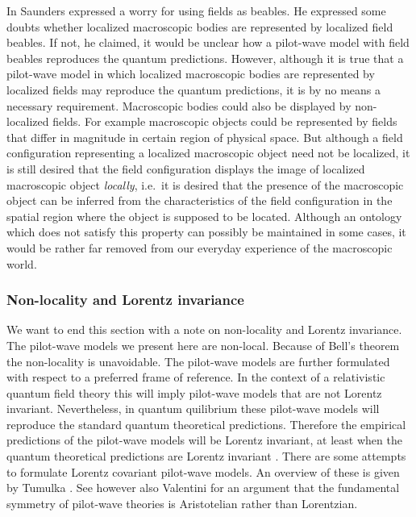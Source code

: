 \documentclass[12pt]{article}
\begin{document}
In \cite{saunders99} Saunders expressed a worry for using fields as beables. He expressed some doubts whether localized macroscopic bodies are represented by localized field beables. If not, he claimed, it would be unclear how a pilot-wave model with field beables reproduces the quantum predictions. However, although it is true that a pilot-wave model in which localized macroscopic bodies are represented by localized fields may reproduce the quantum predictions, it is by no means a necessary requirement. Macroscopic bodies could also be displayed by non-localized fields. For example macroscopic objects could be represented by fields that differ in magnitude in certain region of physical space. But although a field configuration representing a localized macroscopic object need not be localized, it is still desired that the field configuration displays the image of localized macroscopic object {\em locally}, i.e.\ it is desired that the presence of the macroscopic object can be inferred from the characteristics of the field configuration in the spatial region where the object is supposed to be located. Although an ontology which does not satisfy this property can possibly be maintained in some cases, it would be rather far removed from our everyday experience of the macroscopic world.  


\subsubsection{Non-locality and Lorentz invariance}
We want to end this section with a note on non-locality and Lorentz invariance. The pilot-wave models we present here are non-local. Because of Bell's theorem the non-locality is unavoidable. The pilot-wave models are further formulated with respect to a preferred frame of reference. In the context of a relativistic quantum field theory this will imply pilot-wave models that are not Lorentz invariant. Nevertheless, in quantum quilibrium these pilot-wave models will reproduce the standard quantum theoretical predictions. Therefore the empirical predictions of the pilot-wave models will be Lorentz invariant, at least when the quantum theoretical predictions are Lorentz invariant \cite{bohm93,holland93b,berndl96,durr99}. There are some attempts to formulate Lorentz covariant pilot-wave models. An overview of these is given by Tumulka \cite{tumulka06}. See however also Valentini \cite{valentini97} for an argument that the fundamental symmetry of pilot-wave theories is Aristotelian rather than Lorentzian.
\end{document}
